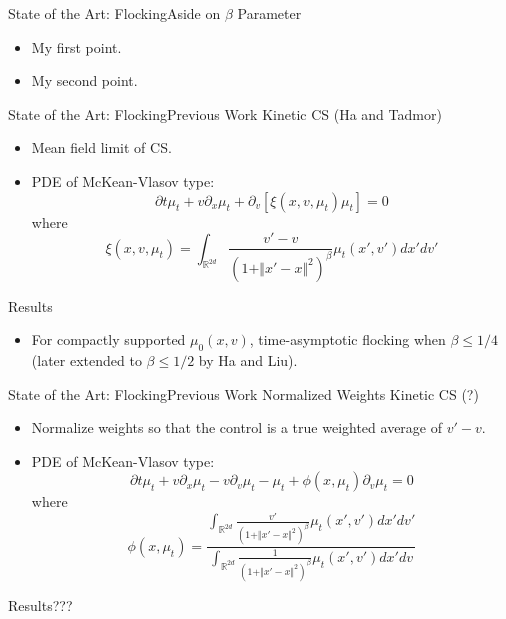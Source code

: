 \documentclass{beamer}
\begin{document}
\begin{frame}{State of the Art: Flocking}{Aside on $\beta$ Parameter}
	\begin{itemize}
		\item {
			My first point.
		}
		\item {
			My second point.
		}
	\end{itemize}
\end{frame}

\begin{frame}{State of the Art: Flocking}{Previous Work}
	Kinetic CS (Ha and Tadmor)
	\begin{itemize}
		\item {
			Mean field limit of CS.
		}
		\item {
			PDE of McKean-Vlasov type:
		}
		\begin{equation}
		\partial t \mu_t+v \partial_x \mu_t+\partial_v \left[\xi (x,v,\mu_t) \mu_t \right]=0
		\end{equation}
		where
		\begin{equation}
		\xi (x,v,\mu_t)=\int_{\mathbb{R}^{2d}} \frac{v'-v}{(1+\Vert x'-x \Vert^2)^\beta}\mu_t(x',v')dx'dv'
		\end{equation}
	\end{itemize}
	Results
	\begin{itemize}
		\item For compactly supported $\mu_0(x,v)$, time-asymptotic flocking when $\beta \leq 1/4$ (later extended to $\beta \leq 1/2$ by Ha and Liu).
	\end{itemize}
\end{frame}

\begin{frame}{State of the Art: Flocking}{Previous Work}
	Normalized Weights Kinetic CS (?)
	\begin{itemize}
		\item {
			Normalize weights so that the control is a true weighted average of $v'-v$.
		}
		\item {
			PDE of McKean-Vlasov type:
		}
		\begin{equation}
		\partial t \mu_t+v \partial_x \mu_t-v \partial_v \mu_t-\mu_t+\phi (x,\mu_t)\partial_v \mu_t=0
		\end{equation}
		where
		\begin{equation}
		\phi (x,\mu_t)=\frac{\int_{\mathbb{R}^{2d}} \frac{v'}{(1+\Vert x'-x \Vert^2)^\beta}\mu_t(x',v')dx'dv'}{\int_{\mathbb{R}^{2d}} \frac{1}{(1+\Vert x'-x \Vert^2)^\beta}\mu_t(x',v')dx'dv}
		\end{equation}
	\end{itemize}
	Results???
\end{frame}
\end{document}
